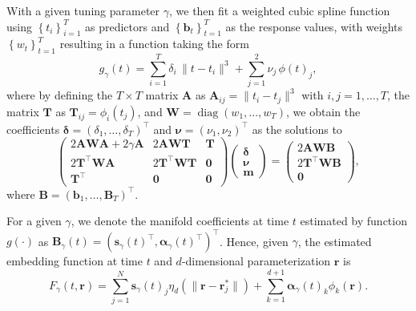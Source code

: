 \documentclass[11pt,reqno]{article}
\newcommand{\T}{\intercal}
\theoremstyle{definition}
\begin{document}
With a given tuning parameter $\gamma$, we then fit a weighted cubic spline function using $\left\{t_i\right\}_{i=1}^T$ as predictors and $\left\{\mathbf{b}_t\right\}_{t=1}^T$ as the response values, with weights $\left\{w_t\right\}_{t=1}^T$ resulting in a function taking the form
\begin{equation}\nonumber
  g_{\gamma}(t) = \sum_{i=1}^{T}\delta_i \,\|t - t_i\|^{3} + \sum_{j=1}^{2}\nu_j\,\phi(t)_j,
\end{equation}
where by defining the $T \times T$ matrix $\mathbf{A}$ as  $\mathbf{A}_{ij} = \|t_i - t_j\|^{3}$ with $i,j = 1,\ldots, T$, the matrix $\mathbf{T}$ as  $\mathbf{T}_{ij} = \phi_i(t_j)$, and $\mathbf{W} = \operatorname{diag}(w_1, \dots, w_T)$, we obtain the coefficients $\mathbf{\delta}=(\delta_1,\ldots,\delta_T)^\T$ and $\mathbf{\nu}=(\nu_1,\nu_2)^\T$ as the solutions to
\begin{equation}
  \left(
  \begin{array}{ccc}
    2\mathbf{A}\mathbf{W}\mathbf{A} + 2\gamma\mathbf{A} & 2\mathbf{A}\mathbf{W}\mathbf{T} & \mathbf{T} \\
    2\mathbf{T}^\T\mathbf{W}\mathbf{A} & 2\mathbf{T}^\T\mathbf{W}\mathbf{T} & \mathbf{0} \\
    \mathbf{T}^\T & \mathbf{0} & \mathbf{0}
  \end{array}
  \right)\left(
  \begin{array}{c}
    \mathbf{\delta} \\
    \mathbf{\nu} \\
    \mathbf{m}
  \end{array}
  \right) = \left(
  \begin{array}{c}
    2\mathbf{A}\mathbf{W}\mathbf{B} \\
    2\mathbf{T}^\T\mathbf{W}\mathbf{B} \\
    \mathbf{0}
  \end{array}
  \right), \label{eq:16}
\end{equation}
where $\mathbf{B}=(\mathbf{b}_1,\ldots, \mathbf{B}_T)^\T$.

For a given $\gamma$, we denote the manifold coefficients at time $t$ estimated by function $g(\cdot)$ as $\mathbf{B}_{\gamma}(t) = \left(\mathbf{s}_{\gamma}(t)^\T, \mathbf{\alpha}_{\gamma}(t)^\T\right)^\T$. Hence, given $\gamma$, the estimated embedding function at time $t$ and $d$-dimensional parameterization $\mathbf{r}$ is
\begin{equation}
  F_{\gamma}(t, \mathbf{r}) = \sum_{j=1}^{N}\mathbf{s}_{\gamma}(t)_j \eta_{d}\left(\|\mathbf{r} - \mathbf{r}_j^*\|\right) + \sum_{k=1}^{d+1}\mathbf{\alpha}_{\gamma}(t)_k \phi_k(\mathbf{r}). \label{eq:17}
\end{equation}
\end{document}
